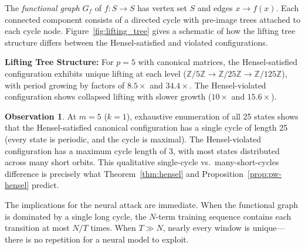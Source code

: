 \documentclass[11pt]{article}
\theoremstyle{plain}
\theoremstyle{definition}
\newtheorem{observation}[theorem]{Observation}
\newcommand{\Z}{\mathbb{Z}}
\begin{document}
The \emph{functional graph} $G_f$ of $f\colon S \to S$ has vertex set $S$ and edges $x \to f(x)$. Each connected component consists of a directed cycle with pre-image trees attached to each cycle node. Figure~\ref{fig:lifting_tree} gives a schematic of how the lifting tree structure differs between the Hensel-satisfied and violated configurations.


\textbf{Lifting Tree Structure:} For $p=5$ with canonical matrices, the Hensel-satisfied configuration exhibits unique lifting at each level ($\Z/5\Z \to \Z/25\Z \to \Z/125\Z$), with period growing by factors of $8.5\times$ and $34.4\times$. The Hensel-violated configuration shows collapsed lifting with slower growth ($10\times$ and $15.6\times$).

\begin{observation}
At $m=5$ ($k=1$), exhaustive enumeration of all 25 states shows that the Hensel-satisfied canonical configuration has a single cycle of length 25 (every state is periodic, and the cycle is maximal). The Hensel-violated configuration has a maximum cycle length of 3, with most states distributed across many short orbits. This qualitative single-cycle vs.\ many-short-cycles difference is precisely what Theorem~\ref{thm:hensel} and Proposition~\ref{prop:pw-hensel} predict.
\end{observation}

The implications for the neural attack are immediate. When the functional graph is dominated by a single long cycle, the $N$-term training sequence contains each transition at most $N/T$ times. When $T \gg N$, nearly every window is unique---there is no repetition for a neural model to exploit.

\end{document}
